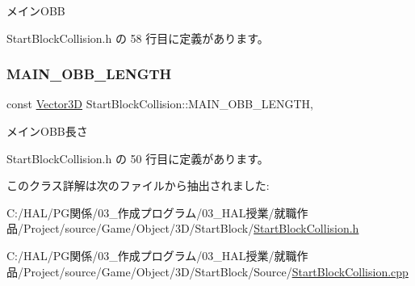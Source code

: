 メイン\+O\+BB 



 Start\+Block\+Collision.\+h の 58 行目に定義があります。

\mbox{\label{class_start_block_collision_a44d290b81523f98265db3c4d2f246954}} 
\subsubsection{\texorpdfstring{M\+A\+I\+N\+\_\+\+O\+B\+B\+\_\+\+L\+E\+N\+G\+TH}{MAIN\_OBB\_LENGTH}}
{\footnotesize\ttfamily const \mbox{\hyperlink{class_vector3_d}{Vector3D}} Start\+Block\+Collision\+::\+M\+A\+I\+N\+\_\+\+O\+B\+B\+\_\+\+L\+E\+N\+G\+TH\hspace{0.3cm}{\ttfamily [static]}, {\ttfamily [private]}}



メイン\+O\+B\+B長さ 



 Start\+Block\+Collision.\+h の 50 行目に定義があります。



このクラス詳解は次のファイルから抽出されました\+:\begin{DoxyCompactItemize}
\item 
C\+:/\+H\+A\+L/\+P\+G関係/03\+\_\+作成プログラム/03\+\_\+\+H\+A\+L授業/就職作品/\+Project/source/\+Game/\+Object/3\+D/\+Start\+Block/\mbox{\hyperlink{_start_block_collision_8h}{Start\+Block\+Collision.\+h}}\item 
C\+:/\+H\+A\+L/\+P\+G関係/03\+\_\+作成プログラム/03\+\_\+\+H\+A\+L授業/就職作品/\+Project/source/\+Game/\+Object/3\+D/\+Start\+Block/\+Source/\mbox{\hyperlink{_start_block_collision_8cpp}{Start\+Block\+Collision.\+cpp}}\end{DoxyCompactItemize}
